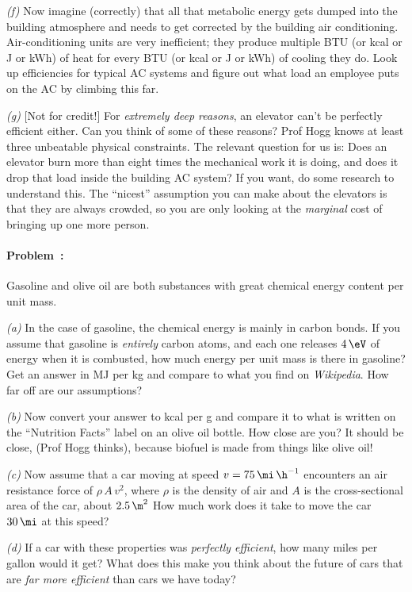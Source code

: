 \documentclass[12pt]{article}
\newcounter{problem}
\begin{document}
\textsl{(f)} Now imagine (correctly) that all that metabolic energy
gets dumped into the building atmosphere and needs to get corrected by
the building air conditioning. Air-conditioning units are very
inefficient; they produce multiple BTU (or kcal or J or kWh) of heat
for every BTU (or kcal or J or kWh) of cooling they do. Look up
efficiencies for typical AC systems and figure out what load an
employee puts on the AC by climbing this far.

\textsl{(g)} [Not for credit!] For \emph{extremely deep reasons}, an
elevator can't be perfectly efficient either. Can you think of some of
these reasons? Prof Hogg knows at least three unbeatable physical
constraints. The relevant question for us is: Does an elevator burn
more than eight times the mechanical work it is doing, and does it
drop that load inside the building AC system? If you want, do some
research to understand this. The ``nicest'' assumption you can make
about the elevators is that they are always crowded, so you are only
looking at the \emph{marginal} cost of bringing up one more person.

\paragraph{Problem~\theproblem:}%
Gasoline and olive oil are both substances with great chemical energy
content per unit mass.

\textsl{(a)} In the case of gasoline, the chemical energy is mainly in
carbon bonds.  If you assume that gasoline is \emph{entirely} carbon
atoms, and each one releases $4\,\eV$ of energy when it is combusted, how
much energy per unit mass is there in gasoline?  Get an answer in MJ
per kg and compare to what you find on \textit{Wikipedia}.  How far off
are our assumptions?

\textsl{(b)} Now convert your answer to kcal per g and compare it to
what is written on the ``Nutrition Facts'' label on an olive oil
bottle.  How close are you?  It should be close, (Prof Hogg thinks), because
biofuel is made from things like olive oil!

\textsl{(c)} Now assume that a car moving at speed
$v=75\,\mi\,\h^{-1}$ encounters an air resistance force of
$\rho\,A\,v^2$, where $\rho$ is the density of air and $A$ is the
cross-sectional area of the car, about $2.5\,\m^2$ How much work does it
take to move the car $30\,\mi$ at this speed?

\textsl{(d)} If a car with these properties was \emph{perfectly
  efficient}, how many miles per gallon would it get?  What does this
make you think about the future of cars that are \emph{far more
  efficient} than cars we have today?
\end{document}
